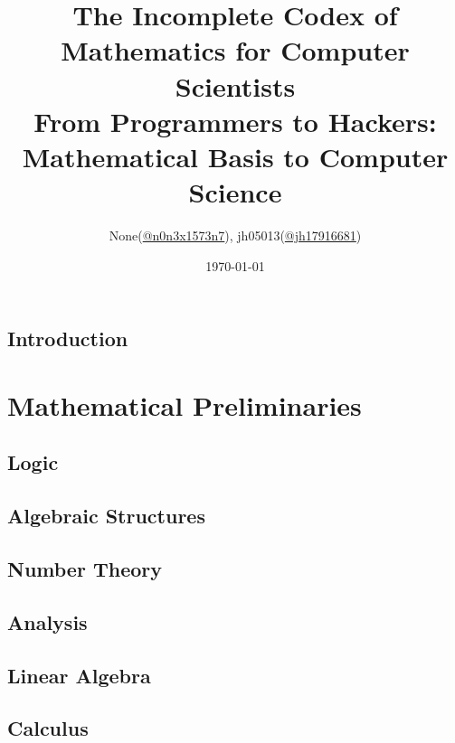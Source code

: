 \documentclass{report}
\title{
	The Incomplete Codex of Mathematics for Computer Scientists\\
	\large From Programmers to Hackers: Mathematical Basis to Computer Science
}
\author{None(\href{https://www.twitter.com/n0n3x1573n7}{@n0n3x1573n7}), jh05013(\href{https://twitter.com/jh17916681}{@jh17916681})}
\date{\today}
\theoremstyle{break}
\begin{document}
	\maketitle

	\chapter{Introduction}
		
	
	\tableofcontents
	
	\part{Mathematical Preliminaries}
	
		\chapter{Logic}
			

		\chapter{Algebraic Structures}
			
	
		\chapter{Number Theory}
			
	
		\chapter{Analysis}
			
		
		\chapter{Linear Algebra}
			
		
		\chapter{Calculus}
			
		
\end{document}
